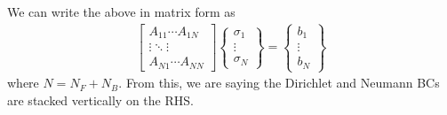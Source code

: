 \documentclass[10pt]{article}
\newcommand{\pp}[2]{\frac{\partial #1}{\partial #2}}
\newcommand{\mbf}[1]{\mathbf{#1}}
\newcommand{\be}{\begin{eqnarray}}
\newcommand{\ee}{\end{eqnarray}}
\newcommand{\tn}[1]{\textnormal{#1}}
\begin{document}

We can write the above in matrix form as
\be
\label{eqn:AIC}
\begin{bmatrix}
    A_{11} \cdots A_{1N} \\
    \vdots \ddots \vdots \\
    A_{N1} \cdots A_{NN}
\end{bmatrix}
\left\{
\begin{matrix}
    \sigma_1 \\
    \vdots   \\
    \sigma_N
\end{matrix}
\right\}
=
\left\{
\begin{matrix}
    b_1    \\
    \vdots \\
    b_N
\end{matrix}
\right\}
\ee
where $N=N_F + N_B$.
From this, we are saying the Dirichlet and Neumann BCs are stacked vertically on the RHS.

\end{document}
